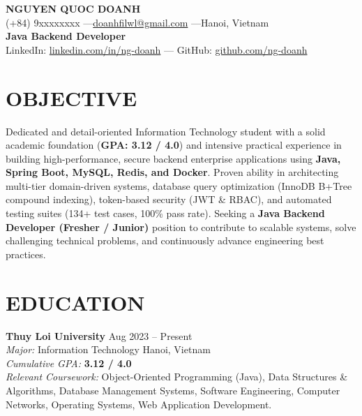 ﻿\documentclass[11pt,a4paper]{article}
\begin{document}
\begin{center}
    {\LARGE \textbf{\color{primary} NGUYEN QUOC DOANH}} \\[4pt]
    (+84) 9xxxxxxxx \enspace---\enspace \href{mailto:doanhfilwl@gmail.com}{doanhfilwl@gmail.com} \enspace---\enspace Hanoi, Vietnam \\[3pt]
    \textbf{\large Java Backend Developer} \\[3pt]
    LinkedIn: \href{https://linkedin.com/in/ng-doanh}{linkedin.com/in/ng-doanh} \enspace---\enspace 
    GitHub: \href{https://github.com/ng-doanh}{github.com/ng-doanh}
\end{center}

\vspace{-2pt}

\section*{OBJECTIVE}
Dedicated and detail-oriented Information Technology student with a solid academic foundation (\textbf{GPA: 3.12 / 4.0}) and intensive practical experience in building high-performance, secure backend enterprise applications using \textbf{Java, Spring Boot, MySQL, Redis, and Docker}. Proven ability in architecting multi-tier domain-driven systems, database query optimization (InnoDB B+Tree compound indexing), token-based security (JWT \& RBAC), and automated testing suites (134+ test cases, 100\% pass rate). Seeking a \textbf{Java Backend Developer (Fresher / Junior)} position to contribute to scalable systems, solve challenging technical problems, and continuously advance engineering best practices.

\section*{EDUCATION}
\noindent
\textbf{Thuy Loi University} \hfill Aug 2023 -- Present \\
\textit{Major:} Information Technology \hfill Hanoi, Vietnam \\
\textit{Cumulative GPA:} \textbf{3.12 / 4.0} \\
\textit{Relevant Coursework:} Object-Oriented Programming (Java), Data Structures \& Algorithms, Database Management Systems, Software Engineering, Computer Networks, Operating Systems, Web Application Development.
\end{document}
